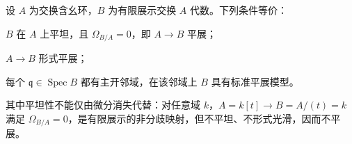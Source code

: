 \begin{theorem}[平展的等价刻画]\label{b3:thm:etale-equivalent-characterizations}\label{b3:thm:closed-point-unramified-not-etale}
	设 \(A\) 为交换含幺环，\(B\) 为有限展示交换 \(A\) 代数。下列条件等价：
	\begin{equivalences}
		\item\label{b3:item:etale-flat-unramified} \(B\) 在 \(A\) 上平坦，且 \(\Omega_{B/A}=0\)，即 \(A\to B\) 平展；
		\item\label{b3:item:etale-formal} \(A\to B\) 形式平展；
		\item\label{b3:item:etale-standard} 每个 \(\mathfrak q\in\operatorname{Spec}B\) 都有主开邻域，在该邻域上 \(B\) 具有标准平展模型。
	\end{equivalences}
	其中平坦性不能仅由微分消失代替：对任意域 \(k\)，\(A=k[t]\to B=A/(t)=k\) 满足 \(\Omega_{B/A}=0\)，是有限展示的非分歧映射，但不平坦、不形式光滑，因而不平展。
\end{theorem}
